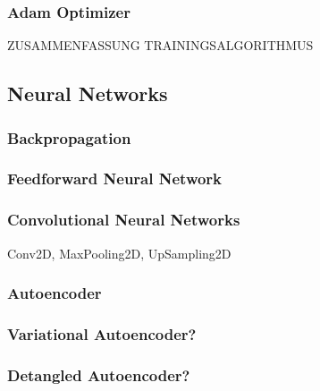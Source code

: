 \documentclass[../main]{subfiles}
\begin{document}
\subsubsection{Adam Optimizer}
ZUSAMMENFASSUNG TRAININGSALGORITHMUS

\subsection{Neural Networks}


\subsubsection{Backpropagation}
\subsubsection{Feedforward Neural Network}
\subsubsection{Convolutional Neural Networks}
Conv2D, MaxPooling2D, UpSampling2D
\subsubsection{Autoencoder}
\subsubsection{Variational Autoencoder?}
\subsubsection{Detangled Autoencoder?}
\end{document}
